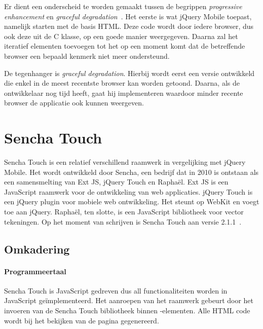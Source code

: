 Er dient een onderscheid te worden gemaakt tussen de begrippen \emph{progressive enhancement} en \emph{graceful degradation}~\cite{Hens2012}. Het eerste is wat jQuery Mobile toepast, namelijk starten met de basis HTML. Deze code wordt door iedere browser, dus ook deze uit de C klasse, op een goede manier weergegeven. Daarna zal het iteratief elementen toevoegen tot het op een moment komt dat de betreffende browser een bepaald kenmerk niet meer ondersteund.

De tegenhanger is \emph{graceful degradation}. Hierbij wordt eerst een versie ontwikkeld die enkel in de meest recentste browser kan worden getoond. Daarna, als de ontwikkelaar nog tijd heeft, gaat hij  implementeren waardoor minder recente browser de applicatie ook kunnen weergeven.


\section{Sencha Touch}

Sencha Touch is een relatief verschillend raamwerk in vergelijking met jQuery Mobile.  Het wordt ontwikkeld door Sencha,  een bedrijf dat in 2010 is ontstaan als een samensmelting van Ext JS,  jQuery Touch en Raphaël.  Ext JS is een JavaScript raamwerk voor de ontwikkeling van web applicaties. jQuery Touch is een jQuery plugin voor mobiele web ontwikkeling.  Het steunt op WebKit en voegt  toe aan jQuery.  Raphaël,  ten slotte,  is een JavaScript bibliotheek voor vector tekeningen. Op het moment van schrijven is Sencha Touch aan versie 2.1.1~\cite{Inc.}.  

\subsection{Omkadering}
\paragraph{Programmeertaal}
Sencha Touch is JavaScript gedreven dus all functionaliteiten worden in JavaScript geïmplementeerd. Het aanroepen van het raamwerk gebeurt door het invoeren van de Sencha Touch bibliotheek binnen -elementen.  Alle HTML code wordt bij het bekijken van de pagina gegenereerd.  

